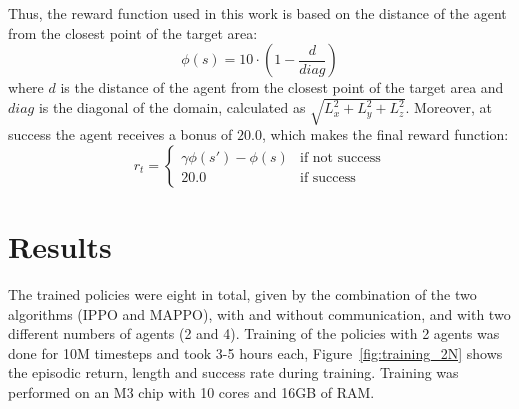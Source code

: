 Thus, the reward function used in this work is based on the distance of the agent from the closest point of the target area:
\begin{equation}
    \phi(s) = 10\cdot \left(1 - \frac{d}{diag}\right)
\end{equation}
where $d$ is the distance of the agent from the closest point of the target area and $diag$ is the diagonal of the domain, calculated as $\sqrt{L_x^2 + L_y^2 + L_z^2}$.
Moreover, at success the agent receives a bonus of $20.0$, which makes the final reward function:
\begin{equation}
    r_t = \begin{cases}
        \gamma\phi(s') - \phi(s) & \text{if not success} \\
        20.0 & \text{if success}
    \end{cases}
\end{equation}

\section{Results}

The trained policies were eight in total, given by the combination of the two algorithms (IPPO and MAPPO), with and without communication, and with two different numbers of agents (2 and 4). 
Training of the policies with 2 agents was done for 10M timesteps and took 3-5 hours each, Figure~\ref{fig:training_2N} shows the episodic return, length and success rate during training.
Training was performed on an M3 chip with 10 cores and 16GB of RAM.

